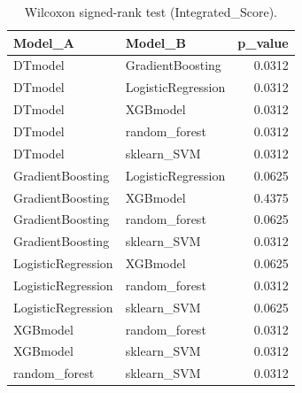 \begin{table}[t]
\centering
\begin{tabular}{llr}
\toprule
Model_A & Model_B & p_value \\
\midrule
DTmodel & GradientBoosting & 0.0312 \\
DTmodel & LogisticRegression & 0.0312 \\
DTmodel & XGBmodel & 0.0312 \\
DTmodel & random_forest & 0.0312 \\
DTmodel & sklearn_SVM & 0.0312 \\
GradientBoosting & LogisticRegression & 0.0625 \\
GradientBoosting & XGBmodel & 0.4375 \\
GradientBoosting & random_forest & 0.0625 \\
GradientBoosting & sklearn_SVM & 0.0312 \\
LogisticRegression & XGBmodel & 0.0625 \\
LogisticRegression & random_forest & 0.0312 \\
LogisticRegression & sklearn_SVM & 0.0625 \\
XGBmodel & random_forest & 0.0312 \\
XGBmodel & sklearn_SVM & 0.0312 \\
random_forest & sklearn_SVM & 0.0312 \\
\bottomrule
\end{tabular}
\caption{Wilcoxon signed-rank test (Integrated_Score).}
\label{tab:wilcoxon_Integrated_Score}
\end{table}